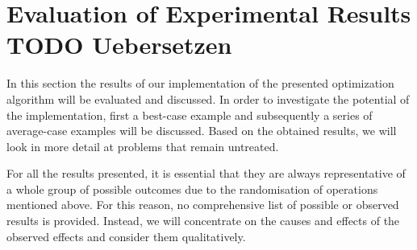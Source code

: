 \documentclass[
	accentcolor=1c,%
	type=intern,
	marginpar=false,
	ruledheaders=section,
	class=report,
	BCOR=5mm,
      parskip=half-,
	fontsize=10pt
	]{tudapub}
\begin{document}
	\newpage
	\section{Evaluation of Experimental Results TODO Uebersetzen}
		In this section the results of our implementation of the presented optimization algorithm will be evaluated and discussed.
		In order to investigate the potential of the implementation, first a best-case example and subsequently a series of average-case examples will be discussed.
		Based on the obtained results, we will look in more detail at problems that remain untreated.

		For all the results presented, it is essential that they are always representative of a whole group of possible outcomes due to the randomisation of operations mentioned above.
		For this reason, no comprehensive list of possible or observed results is provided.
		Instead, we will concentrate on the causes and effects of the observed effects and consider them qualitatively.
\end{document}
